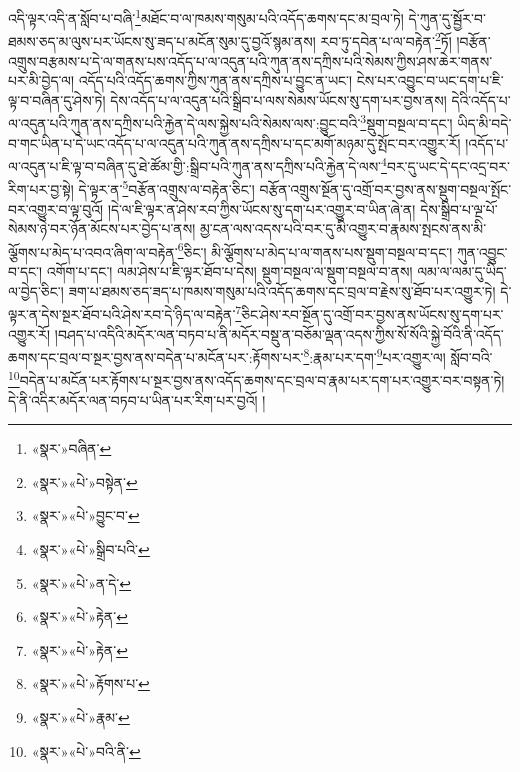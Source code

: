 འདི་ལྟར་འདི་ན་སློབ་པ་བཞི་\footnote{«སྣར་»བཞིན་}མཐོང་བ་ལ་ཁམས་གསུམ་པའི་འདོད་ཆགས་དང་མ་བྲལ་ཏེ། དེ་ཀུན་དུ་སྦྱོར་བ་ཐམས་ཅད་མ་ལུས་པར་ཡོངས་སུ་ཟད་པ་མངོན་སུམ་དུ་བྱའོ་སྙམ་ནས། རབ་ཏུ་དབེན་པ་ལ་བརྟེན་\footnote{«སྣར་»«པེ་»བསྟེན་}ཏོ། །བརྩོན་འགྲུས་བརྩམས་པ་དེ་ལ་གནས་པས་འདོད་པ་ལ་འདུན་པའི་ཀུན་ནས་དཀྲིས་པའི་སེམས་ཀྱིས་ཤས་ཆེར་གནས་པར་མི་བྱེད་ལ། འདོད་པའི་འདོད་ཆགས་ཀྱིས་ཀུན་ནས་དཀྲིས་པ་བྱུང་ན་ཡང་། ངེས་པར་འབྱུང་བ་ཡང་དག་པ་ཇི་ལྟ་བ་བཞིན་དུ་ཤེས་ཏེ། དེས་འདོད་པ་ལ་འདུན་པའི་སྒྲིབ་པ་ལས་སེམས་ཡོངས་སུ་དག་པར་བྱས་ནས། དེའི་འདོད་པ་ལ་འདུན་པའི་ཀུན་ནས་དཀྲིས་པའི་རྐྱེན་དེ་ལས་སྐྱེས་པའི་སེམས་ལས་:བྱུང་བའི་\footnote{«སྣར་»«པེ་»བྱུང་བ་}སྡུག་བསྔལ་བ་དང་། ཡིད་མི་བདེ་བ་གང་ཡིན་པ་དེ་ཡང་འདོད་པ་ལ་འདུན་པའི་ཀུན་ནས་དཀྲིས་པ་དང་མགོ་མཉམ་དུ་སྤོང་བར་འགྱུར་རོ། །འདོད་པ་ལ་འདུན་པ་ཇི་ལྟ་བ་བཞིན་དུ་ཐེ་ཚོམ་གྱི་:སྒྲིབ་པའི་ཀུན་ནས་དཀྲིས་པའི་རྐྱེན་དེ་ལས་\footnote{«སྣར་»«པེ་»སྒྲིབ་པའི་}བར་དུ་ཡང་དེ་དང་འདྲ་བར་རིག་པར་བྱ་སྟེ། དེ་ལྟར་ན་\footnote{«སྣར་»«པེ་»ན་དེ་}བརྩོན་འགྲུས་ལ་བརྟེན་ཅིང་། བརྩོན་འགྲུས་སྔོན་དུ་འགྲོ་བར་བྱས་ནས་སྡུག་བསྔལ་སྤོང་བར་འགྱུར་བ་ལྟ་བུའོ། །དེ་ལ་ཇི་ལྟར་ན་ཤེས་རབ་ཀྱིས་ཡོངས་སུ་དག་པར་འགྱུར་བ་ཡིན་ཞེ་ན། དེས་སྒྲིབ་པ་ལྔ་པོ་སེམས་ཉེ་བར་ཉོན་མོངས་པར་བྱེད་པ་ནས། མྱ་ངན་ལས་འདས་པའི་བར་དུ་མི་འགྱུར་བ་རྣམས་སྤངས་ནས་མི་ལྕོགས་པ་མེད་པ་འབའ་ཞིག་ལ་བརྟེན་\footnote{«སྣར་»«པེ་»རྟེན་}ཅིང་། མི་ལྕོགས་པ་མེད་པ་ལ་གནས་པས་སྡུག་བསྔལ་བ་དང་། ཀུན་འབྱུང་བ་དང་། འགོག་པ་དང་། ལམ་ཤེས་པ་ཇི་ལྟར་ཐོབ་པ་དེས། སྡུག་བསྔལ་ལ་སྡུག་བསྔལ་བ་ནས། ལམ་ལ་ལམ་དུ་ཡིད་ལ་བྱེད་ཅིང་། ཟག་པ་ཐམས་ཅད་ཟད་པ་ཁམས་གསུམ་པའི་འདོད་ཆགས་དང་བྲལ་བ་རྗེས་སུ་ཐོབ་པར་འགྱུར་ཏེ། དེ་ལྟར་ན་དེས་སྔར་ཐོབ་པའི་ཤེས་རབ་དེ་ཉིད་ལ་བརྟེན་\footnote{«སྣར་»«པེ་»རྟེན་}ཅིང་ཤེས་རབ་སྔོན་དུ་འགྲོ་བར་བྱས་ནས་ཡོངས་སུ་དག་པར་འགྱུར་རོ། །བཤད་པ་འདིའི་མདོར་ལན་བཏབ་པ་ནི་མདོར་བསྡུ་ན་བཅོམ་ལྡན་འདས་ཀྱིས་སོ་སོའི་སྐྱེ་བོའི་ནི་འདོད་ཆགས་དང་བྲལ་བ་སྔར་བྱས་ནས་བདེན་པ་མངོན་པར་:རྟོགས་པར་\footnote{«སྣར་»«པེ་»རྟོགས་པ་}:རྣམ་པར་དག་\footnote{«སྣར་»«པེ་»རྣམ་}པར་འགྱུར་ལ། སློབ་བའི་\footnote{«སྣར་»«པེ་»བའི་ནི་}བདེན་པ་མངོན་པར་རྟོགས་པ་སྔར་བྱས་ནས་འདོད་ཆགས་དང་བྲལ་བ་རྣམ་པར་དག་པར་འགྱུར་བར་བསྟན་ཏེ། དེ་ནི་འདིར་མདོར་ལན་བཏབ་པ་ཡིན་པར་རིག་པར་བྱའོ། །
